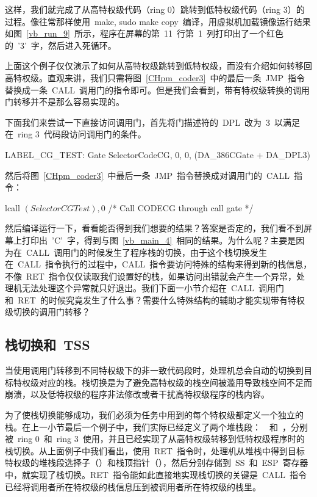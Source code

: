 这样，我们就完成了从高特权级代码（ring 0）跳转到低特权级代码（ring 3）的过程。像往常那样使用~make, sudo make copy~编译，用虚拟机加载镜像运行结果如图~\ref{vb_run_9}~所示，程序在屏幕的第~11~行第~1~列打印出了一个红色的~'3'~字，然后进入死循环。


上面这个例子仅仅演示了如何从高特权级跳转到低特权级，而没有介绍如何转移回高特权级。直观来讲，我们只需将图~\ref{CHpm_coder3}~中的最后一条~JMP~指令替换成一条~CALL~调用门的指令即可。但是我们会看到，带有特权级转换的调用门转移并不是那么容易实现的。

下面我们来尝试一下直接访问调用门，首先将门描述符的~DPL~改为~3~以满足在~ring 3~代码段访问调用门的条件。

\begin{Command}
LABEL_CG_TEST:      Gate    SelectorCodeCG, 0, 0, (DA_386CGate + DA_DPL3)
\end{Command}

然后将图~\ref{CHpm_coder3}~中最后一条~JMP~指令替换成对调用门的~CALL~指令：

\begin{Command}
lcall   $(SelectorCGTest), $0  /* Call CODECG through call gate */
\end{Command}

然后编译运行一下，看看能否得到我们想要的结果？答案是否定的，我们看不到屏幕上打印出~'C'~字，得到与图~\ref{vb_main_4}~相同的结果。为什么呢？主要是因为在~CALL~调用门的时候发生了程序栈的切换，由于这个栈切换发生在~CALL~指令执行的过程中，CALL~指令要访问特殊的结构来得到新的栈信息，不像~RET~指令仅仅读取我们设置好的栈，如果访问出错就会产生一个异常，处理机无法处理这个异常就只好退出。我们下面一小节介绍在~CALL~调用门和~RET~的时候究竟发生了什么事？需要什么特殊结构的辅助才能实现带有特权级切换的调用门转移？

\subsection{栈切换和~TSS}

当使用调用门转移到不同特权级下的非一致代码段时，处理机总会自动的切换到目标特权级对应的栈。栈切换是为了避免高特权级的栈空间被滥用导致栈空间不足而崩溃，以及低特权级的程序非法修改或者干扰高特权级程序的栈内容。

为了使栈切换能够成功，我们必须为任务中用到的每个特权级都定义一个独立的栈。在上一小节最后一个例子中，我们实际已经定义了两个堆栈段：~~和~，分别被~ring 0~和~ring 3~使用，并且已经实现了从高特权级转移到低特权级程序时的栈切换。从上面例子中我们看出，使用~RET~指令时，处理机从堆栈中得到目标特权级的堆栈段选择子（）和栈顶指针（），然后分别存储到~SS~和~ESP~寄存器中，就实现了栈切换。RET~指令能如此直接地实现栈切换的关键是~CALL~指令已经将调用者所在特权级的栈信息压到被调用者所在特权级的栈里。

